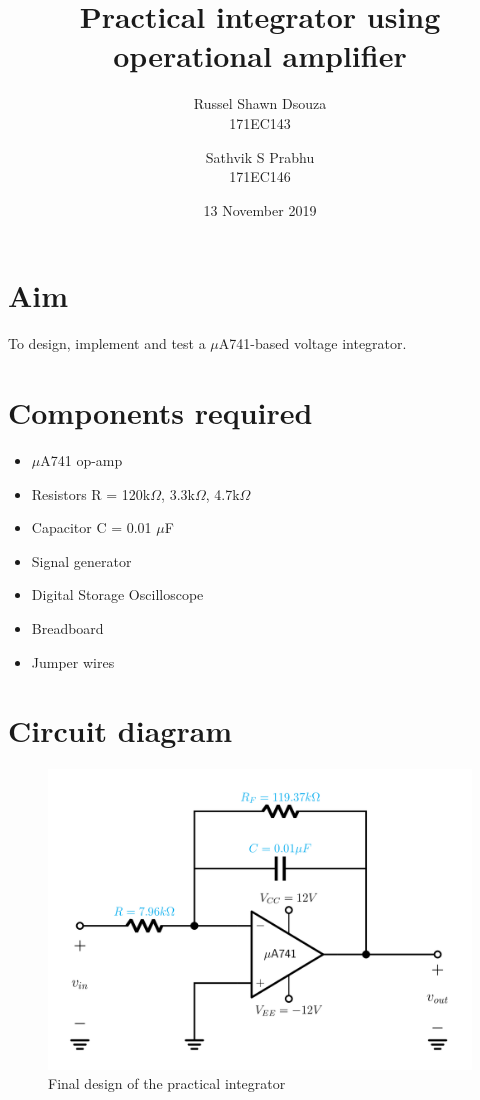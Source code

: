 \documentclass[12pt, titlepage]{article}
\title{\textbf{Practical integrator using operational amplifier}}
\author{
  Russel Shawn Dsouza\\
  171EC143
  \and
  Sathvik S Prabhu\\
  171EC146
}
\date{13 November 2019}
\theoremstyle{definition}
\begin{document}
  \maketitle
  \thispagestyle{empty}

  \newpage
  \tableofcontents
  \thispagestyle{empty}

  \newpage
  \setcounter{page}{1}
  \section{Aim}
  To design, implement and test a $\mu$A741-based voltage integrator.


  \section*{Components required}
    \begin{itemize}
      \item $\mu$A741 op-amp
      \item Resistors R = 120k$\Omega$, 3.3k$\Omega$, 4.7k$\Omega$
      \item Capacitor C = 0.01 $\mu$F
      \item Signal generator
      \item Digital Storage Oscilloscope
      \item Breadboard
      \item Jumper wires
    \end{itemize}


  \newpage
  \section{Circuit diagram}
    \begin{figure}[h]
      \centering
      \includegraphics[scale=0.25]{images/designed_practical_integrator.png}
      \caption{Final design of the practical integrator}
      \label{fig:designed_practical_integrator}
    \end{figure}
\end{document}
